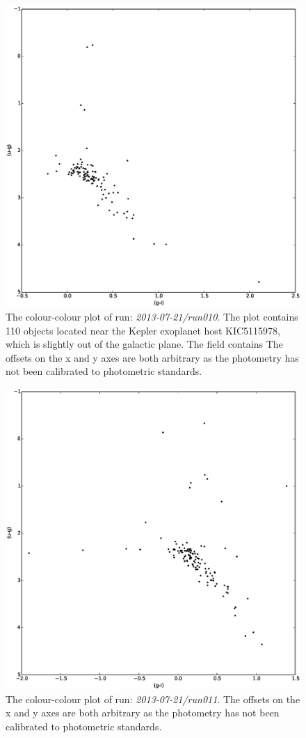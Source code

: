 \begin{figure}[!h]
\centering
\includegraphics[width=120mm]{images/2013-07-21-run010-2colour.eps}
\caption{The colour-colour plot of run: \emph{2013-07-21/run010}. The plot contains 110 objects located near the Kepler exoplanet host KIC5115978, which is slightly out of the galactic plane. The field contains The offsets on the x and y axes are both arbitrary as the photometry has not been calibrated to photometric standards.}
\label{fig:differentialtrad}
\end{figure}

\begin{figure}[!h]
\centering
\includegraphics[width=120mm]{images/2013-07-21-run011-2colour.eps}
\caption{The colour-colour plot of run: \emph{2013-07-21/run011}. The offsets on the x and y axes are both arbitrary as the photometry has not been calibrated to photometric standards.}
\label{fig:differentialtrad}
\end{figure}


